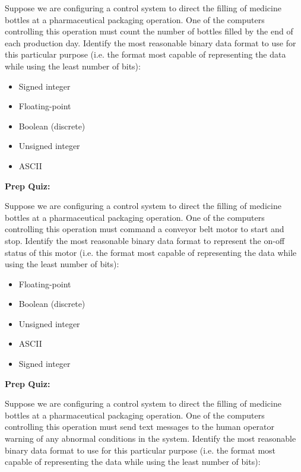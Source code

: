 Suppose we are configuring a control system to direct the filling of medicine bottles at a pharmaceutical packaging operation.  One of the computers controlling this operation must count the number of bottles filled by the end of each production day.  Identify the most reasonable binary data format to use for this particular purpose (i.e. the format most capable of representing the data while using the least number of bits):

\begin{itemize}
\item{} Signed integer 
\vskip 5pt 
\item{} Floating-point 
\vskip 5pt 
\item{} Boolean (discrete)
\vskip 5pt 
\item{} Unsigned integer 
\vskip 5pt 
\item{} ASCII
\end{itemize}





\vfil \eject

\noindent
{\bf Prep Quiz:}

Suppose we are configuring a control system to direct the filling of medicine bottles at a pharmaceutical packaging operation.  One of the computers controlling this operation must command a conveyor belt motor to start and stop.  Identify the most reasonable binary data format to represent the on-off status of this motor (i.e. the format most capable of representing the data while using the least number of bits):

\begin{itemize}
\item{} Floating-point 
\vskip 5pt 
\item{} Boolean (discrete)
\vskip 5pt 
\item{} Unsigned integer 
\vskip 5pt 
\item{} ASCII
\vskip 5pt 
\item{} Signed integer 
\end{itemize}




\vfil \eject

\noindent
{\bf Prep Quiz:}

Suppose we are configuring a control system to direct the filling of medicine bottles at a pharmaceutical packaging operation.  One of the computers controlling this operation must send text messages to the human operator warning of any abnormal conditions in the system.  Identify the most reasonable binary data format to use for this particular purpose (i.e. the format most capable of representing the data while using the least number of bits):

